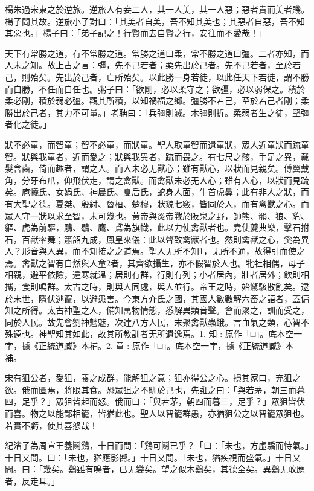 \begin{pinyinscope}
楊朱過宋東之於逆旅。逆旅人有妾二人，其一人美，其一人惡；惡者貴而美者賤。楊子問其故。逆旅小子對曰：「其美者自美，吾不知其美也；其惡者自惡，吾不知其惡也。」楊子曰：「弟子記之！行賢而去自賢之行，安往而不愛哉！」

天下有常勝之道，有不常勝之道。常勝之道曰柔，常不勝之道曰彊。二者亦知，而人未之知。故上古之言：彊，先不己若者；柔先出於己者。先不己若者，至於若己，則殆矣。先出於己者，亡所殆矣。以此勝一身若徒，以此任天下若徒，謂不勝而自勝，不任而自任也。粥子曰：「欲剛，必以柔守之；欲彊，必以弱保之。積於柔必剛，積於弱必彊。觀其所積，以知禍福之鄉。彊勝不若己，至於若己者剛；柔勝出於己者，其力不可量。」老聃曰：「兵彊則滅。木彊則折。柔弱者生之徒，堅彊者化之徒。」

狀不必童，而智童；智不必童，而狀童。聖人取童智而遺童狀，眾人近童狀而䟽童智。狀與我童者，近而愛之；狀與我異者，䟽而畏之。有七尺之骸，手足之異，戴髮含齒，倚而趣者，謂之人。而人未必无獸心；雖有獸心，以狀而見親矣。傅翼戴角，分牙布爪，仰飛伏走，謂之禽獸。而禽獸未必无人心；雖有人心，以狀而見䟽矣。庖犧氏、女媧氏、神農氏、夏后氏，蛇身人面，牛首虎鼻；此有非人之狀，而有大聖之德。夏桀、殷紂、魯桓、楚穆，狀貌七竅，皆同於人，而有禽獸之心。而眾人守一狀以求至智，未可幾也。黃帝與炎帝戰於阪泉之野，帥熊、羆、狼、豹、貙、虎為前驅，鵰、鶡、鷹、鳶為旗幟，此以力使禽獸者也。堯使夔典樂，擊石拊石，百獸率舞；簫韶九成，鳳皇來儀：此以聲致禽獸者也。然則禽獸之心，奚為異人？形音與人異，而不知接之之道焉。聖人无所不知1，无所不通，故得引而使之焉。禽獸之智有自然與人童2者，其齊欲攝生，亦不假智於人也。牝牡相偶，母子相親，避平依險，違寒就溫；居則有群，行則有列；小者居內，壯者居外；飲則相攜，食則鳴群。太古之時，則與人同處，與人並行。帝王之時，始驚駭散亂矣。逮於末世，隱伏逃竄，以避患害。今東方介氏之國，其國人數數解六畜之語者，蓋偏知之所得。太古神聖之人，備知萬物情態，悉解異類音聲。會而聚之，訓而受之，同於人民。故先會劉神魑魅，次達八方人民，末聚禽獸蟲蛾。言血氣之類，心智不殊遠也。神聖知其如此，故其所教訓者无所遺逸焉。1. 知 : 原作「□」。底本空一字，據《正統道臧》本補。2. 童 : 原作「□」。底本空一字，據《正統道臧》本補。

宋有狙公者，愛狙，養之成群，能解狙之意；狙亦得公之心。損其家口，充狙之欲。俄而匱焉，將限其食。恐眾狙之不馴於己也，先誑之曰：「與若茅，朝三而暮四，足乎？」眾狙皆起而怒。俄而曰：「與若茅，朝四而暮三，足乎？」眾狙皆伏而喜。物之以能鄙相籠，皆猶此也。聖人以智籠群愚，亦猶狙公之以智籠眾狙也。若實不虧，使其喜怒哉！

紀渻子為周宣王養鬭鷄，十日而問：「鷄可鬭已乎？「曰：「未也，方虛驕而恃氣。」十日又問。曰：「未也，猶應影嚮。」十日又問。「未也，猶疾視而盛氣。」十日又問。曰：「幾矣。鷄雖有鳴者，已无變矣。望之似木鷄矣，其德全矣。異鷄无敢應者，反走耳。」


\end{pinyinscope}
